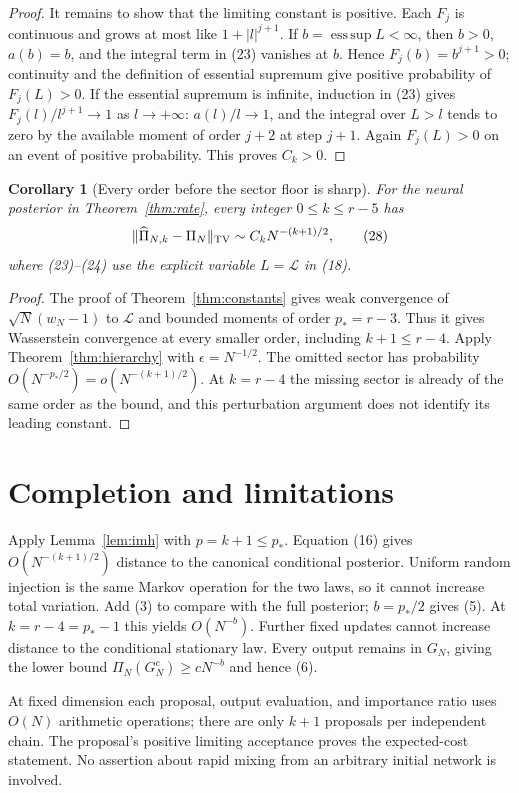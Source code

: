 \documentclass[11pt]{article}
\newtheorem{corollary}[theorem]{Corollary}
\begin{document}
\begin{proof}
It remains to show that the limiting constant is positive. Each $F_j$
is continuous and grows at most like $1+|l|^{j+1}$. If
$b=\operatorname{ess\,sup}L<\infty$, then $b>0$, $a(b)=b$, and
the integral term in (23) vanishes at $b$. Hence $F_j(b)=b^{j+1}>0$;
continuity and the definition of essential supremum give positive
probability of $F_j(L)>0$. If the essential supremum is infinite,
induction in (23) gives $F_j(l)/l^{j+1}\to1$ as $l\to+\infty$:
$a(l)/l\to1$, and the integral over $L>l$ tends to zero by the
available moment of order $j+2$ at step $j+1$. Again $F_j(L)>0$ on
an event of positive probability. This proves $C_k>0$.
\end{proof}

\begin{corollary}[Every order before the sector floor is sharp]
For the neural posterior in Theorem~\ref{thm:rate}, every integer
$0\le k\le r-5$ has
\[
             \|\widehat\Pi_{N,k}-\Pi_N\|_{\mathrm{TV}}
                         \sim C_kN^{-(k+1)/2},          \tag{28}
\]
where (23)--(24) use the explicit variable $L=\mathcal L$ in (18).
\end{corollary}
\begin{proof}
The proof of Theorem~\ref{thm:constants} gives weak convergence of
$\sqrt N(w_N-1)$ to $\mathcal L$ and bounded moments of order
$p_*=r-3$. Thus it gives Wasserstein convergence at every smaller
order, including $k+1\le r-4$. Apply Theorem~\ref{thm:hierarchy} with
$\epsilon=N^{-1/2}$. The omitted sector has probability
$O(N^{-p_*/2})=o(N^{-(k+1)/2})$. At $k=r-4$ the missing sector is
already of the same order as the bound, and this perturbation argument
does not identify its leading constant.
\end{proof}

\section{Completion and limitations}
Apply Lemma~\ref{lem:imh} with $p=k+1\le p_*$. Equation (16) gives
$O(N^{-(k+1)/2})$ distance to the canonical conditional posterior.
Uniform random injection is the same Markov operation for the two laws,
so it cannot increase total variation. Add (3) to compare with the full
posterior; $b=p_*/2$ gives (5). At $k=r-4=p_*-1$ this yields
$O(N^{-b})$. Further fixed updates cannot increase distance to the
conditional stationary law. Every output remains in $G_N$, giving the
lower bound $\Pi_N(G_N^c)\ge cN^{-b}$ and hence (6).

At fixed dimension each proposal, output evaluation, and importance
ratio uses $O(N)$ arithmetic operations; there are only $k+1$ proposals
per independent chain. The proposal's positive limiting acceptance
proves the expected-cost statement. No assertion about rapid mixing
from an arbitrary initial network is involved.
\end{document}
